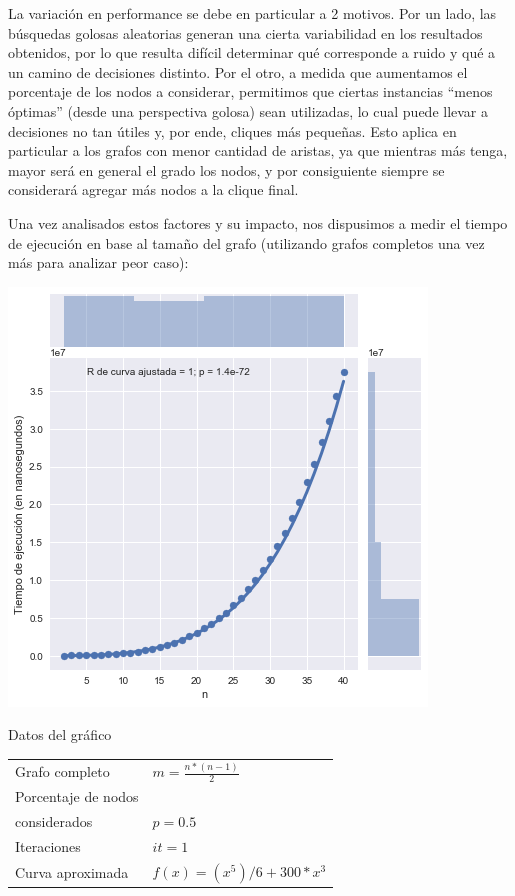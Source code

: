 La variación en performance se debe en particular a 2 motivos. Por un lado, las búsquedas golosas aleatorias generan una cierta variabilidad en los resultados obtenidos, por lo que resulta difícil determinar qué corresponde a ruido y qué a un camino de decisiones distinto. Por el otro, a medida que aumentamos el porcentaje de los nodos a considerar, permitimos que ciertas instancias ``menos óptimas'' (desde una perspectiva golosa) sean utilizadas, lo cual puede llevar a decisiones no tan útiles y, por ende, cliques más pequeñas. Esto aplica en particular a los grafos con menor cantidad de aristas, ya que mientras más tenga, mayor será en general el grado los nodos, y por consiguiente siempre se considerará agregar más nodos a la clique final.

Una vez analisados estos factores y su impacto, nos dispusimos a medir el tiempo de ejecución en base al tamaño del grafo (utilizando grafos completos una vez más para analizar peor caso):

\noindent
\begin{minipage}{0.55\textwidth}
    \hfill
    \includegraphics[scale=0.6]{img/grasp-n.png}
\end{minipage}
\hfill
\begin{minipage}{0.44\textwidth}
    \begin{center}
        Datos del gráfico

        \begin{tabular}{ | l l |}
            \hline
            Grafo completo & $m =  \frac{n * (n-1)}{2}$ \\
            Porcentaje de nodos & \\
            considerados & $p = 0.5$ \\
            Iteraciones & $it = 1$ \\
            Curva aproximada & $f(x) = (x^5) / 6 + 300 * x^3$ \\
            \hline
        \end{tabular}
    \end{center}
\end{minipage}

